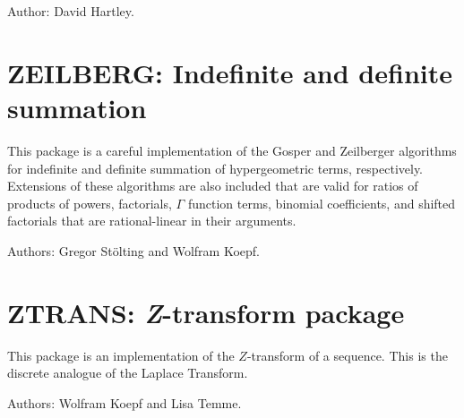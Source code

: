 Author: David Hartley.



\newpage

\section{ZEILBERG: Indefinite and definite summation}


This package is a careful implementation of the Gosper and Zeilberger
algorithms for indefinite and definite summation of hypergeometric terms,
respectively.  Extensions of these algorithms are also included that are
valid for ratios of products of powers, factorials, $\Gamma$ function
terms, binomial coefficients, and shifted factorials that are
rational-linear in their arguments.

Authors: Gregor St\"olting and Wolfram Koepf.



\newpage

\section{ZTRANS: \textit{Z}-transform package}


This package is an implementation of the $Z$-transform of a sequence.
This is the discrete analogue of the Laplace Transform.

Authors: Wolfram Koepf and Lisa Temme.



\let\sectionmark=\origsectionmark
